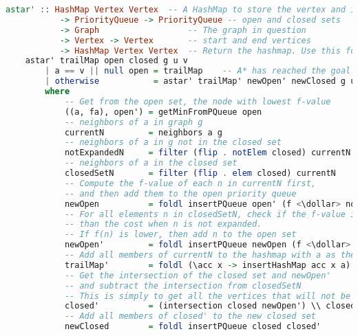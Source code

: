 \begin{lstlisting}[language=Haskell, caption=A* Helper Function Pseudocode]
    astar' :: HashMap Vertex Vertex  -- A HashMap to store the vertex and its parent 
           -> PriorityQueue -> PriorityQueue -- open and closed sets
           -> Graph                  -- The graph in question
           -> Vertex -> Vertex       -- start and end vertices 
           -> HashMap Vertex Vertex  -- Return the hashmap. Use this for path reconstruction
    astar' trailMap open closed g u v
        | a == v || null open = trailMap    -- A* has reached the goal or open set is null 
        | otherwise           = astar' trailMap' newOpen' newClosed g u v
        where
            -- Get from the open set, the node with lowest f-value 
            ((a, fa), open') = getMinFromPQueue open        
            -- neighbors of a in graph g
            currentN         = neighbors a g
            -- neighbors of a in g not in the closed set
            notExpandedN     = filter (flip . notElem closed) currentN
            -- neighbors of a in the closed set
            closedSetN       = filter (flip . elem closed) currentN
            -- Compute the f-value of each n in currentN first, 
            -- and then add them to the open priority queue
            newOpen          = foldl insertPQueue open' (f <\dollar> notExpandedN)
            -- For all elements n in closedSetN, check if the f-value is lower 
            -- than the cost when n is not expanded.
            -- If f(n) is lower, then add n to the open set 
            newOpen'         = foldl insertPQueue newOpen (f <\dollar> closedSetN)
            -- Add all members of currentN to the hashmap with a as their parent vertex 
            trailMap'        = foldl (\acc x -> insertHashMap acc x a) trailMap currentN
            -- Get the intersection of the closed set and newOpen'
            -- and subtract the intersection from closedSetN
            -- This is simply to get all the vertices that will not be expanded 
            closed'          = (intersection closed newOpen') \\ closedSetN
            -- Add all members of closed' to the new closed set
            newClosed        = foldl insertPQueue closed closed'
\end{lstlisting}

